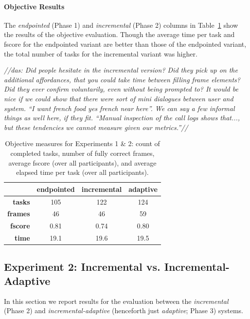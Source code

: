 \documentclass[11pt]{article}
\newcommand{\das}[1]{{\color{red}\emph{//das: #1//}}}
\begin{document}
\paragraph{Objective Results}  The \emph{endpointed} (Phase 1) and \emph{incremental} (Phase 2) columns in Table~\ref{tab:objscores} show the results of the objective evaluation. Though the average time per task and fscore for the endpointed variant are better than those of the endpointed variant, the total number of tasks for the incremental variant was higher. 

\das{Did people hesitate in the incremental version? Did they pick up on the additional affordances, that you could take time between filling frame elements? Did they ever confirm voluntarily, even without being prompted to? It would be nice if we could show that there were sort of mini dialogues between user and system. ``I want french food yes french near here''. We can say a few informal things as well here, if they fit. ``Manual inspection of the call logs shows that..., but these tendencies we cannot measure given our metrics.''}

\begin{table}
 \begin{tabular}{|r|c|c|c|}
\hline
                     & \textbf{endpointed} & \textbf{incremental} & \textbf{adaptive} \\
\hline
\textbf{tasks} & 105 & 122 & 124  \\
\textbf{frames} & 46 & 46 & 59 \\
\textbf{fscore} & 0.81 & 0.74 & 0.80 \\
\textbf{time} & 19.1 & 19.6 & 19.5 \\
 \hline
\end{tabular}
\caption{Objective measures for Experiments 1 \& 2: count of completed tasks, number of fully correct frames, average fscore (over all participants), and average elapsed time per task (over all participants).}
\label{tab:objscores}
\end{table}

\subsection{Experiment 2: Incremental vs. Incremental-Adaptive}
\label{section:exp2}

In this section we report results for the evaluation between the \emph{incremental} (Phase 2) and \emph{incremental-adaptive} (henceforth just \emph{adaptive}; Phase 3) systems. 
\end{document}
